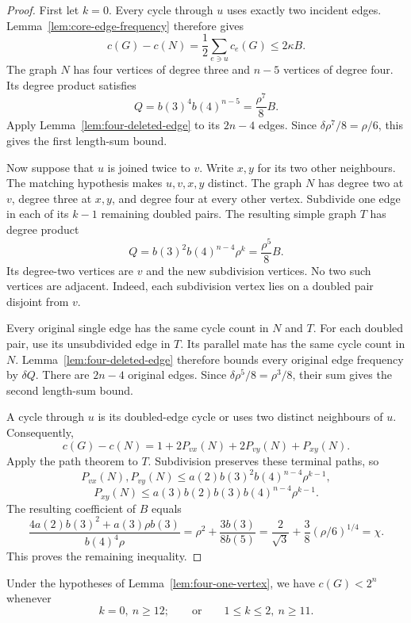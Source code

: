 \begin{proof}
First let $k=0$.
Every cycle through $u$ uses exactly two incident edges.
Lemma~\ref{lem:core-edge-frequency} therefore gives
\[
 c(G)-c(N)=\frac12\sum_{e\ni u}c_e(G)\le2\kappa B.
\]
The graph $N$ has four vertices of degree three and $n-5$ vertices of degree four.
Its degree product satisfies
\[
 Q=b(3)^4b(4)^{n-5}=\frac{\rho^7}{8}B.
\]
Apply Lemma~\ref{lem:four-deleted-edge} to its $2n-4$ edges.
Since $\delta\rho^7/8=\rho/6$, this gives the first length-sum bound.

Now suppose that $u$ is joined twice to $v$.
Write $x,y$ for its two other neighbours.
The matching hypothesis makes $u,v,x,y$ distinct.
The graph $N$ has degree two at $v$, degree three at $x,y$, and degree four at every other vertex.
Subdivide one edge in each of its $k-1$ remaining doubled pairs.
The resulting simple graph $T$ has degree product
\[
 Q=b(3)^2b(4)^{n-4}\rho^k
   =\frac{\rho^5}{8}B.
\]
Its degree-two vertices are $v$ and the new subdivision vertices.
No two such vertices are adjacent.
Indeed, each subdivision vertex lies on a doubled pair disjoint from $v$.

Every original single edge has the same cycle count in $N$ and $T$.
For each doubled pair, use its unsubdivided edge in $T$.
Its parallel mate has the same cycle count in $N$.
Lemma~\ref{lem:four-deleted-edge} therefore bounds every original edge frequency by $\delta Q$.
There are $2n-4$ original edges.
Since $\delta\rho^5/8=\rho^3/8$, their sum gives the second length-sum bound.

A cycle through $u$ is its doubled-edge cycle or uses two distinct neighbours of $u$.
Consequently,
\[
 c(G)-c(N)=1+2P_{vx}(N)+2P_{vy}(N)+P_{xy}(N).
\]
Apply the path theorem to $T$.
Subdivision preserves these terminal paths, so
\[
 P_{vx}(N),P_{vy}(N)
 \le a(2)b(3)^2b(4)^{n-4}\rho^{k-1},
\]
\[
 P_{xy}(N)\le a(3)b(2)b(3)b(4)^{n-4}\rho^{k-1}.
\]
The resulting coefficient of $B$ equals
\[
 \frac{4a(2)b(3)^2+a(3)\rho b(3)}{b(4)^4\rho}
 =\rho^2+\frac{3b(3)}{8b(5)}
 =\frac2{\sqrt3}+\frac38(\rho/6)^{1/4}
 =\chi.
\]
This proves the remaining inequality.
\end{proof}

\begin{theorem}\label{thm:four-deletion-cutoff}
Under the hypotheses of Lemma~\ref{lem:four-one-vertex}, we have $c(G)<2^n$ whenever
\[
 k=0,\ n\ge12;\qquad\text{or}\qquad
 1\le k\le2,\ n\ge11.
\]
\end{theorem}

